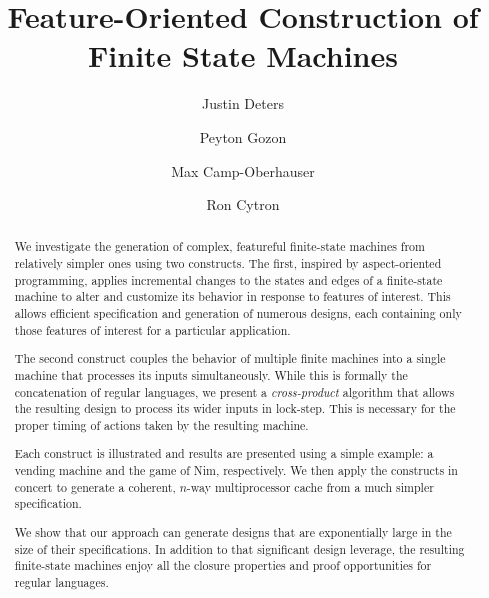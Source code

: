 \documentclass[sigplan,anonymous, review]{acmart}
\begin{document}
\title{Feature-Oriented Construction of Finite State Machines}

\author{Justin Deters}

\author{Peyton Gozon}

\author{Max Camp-Oberhauser}

\author{Ron Cytron}


\renewcommand{\shortauthors}{Deters et al.}

\begin{abstract}
We investigate the generation of complex, featureful finite-state machines from relatively simpler ones using two constructs.  The first, inspired by aspect-oriented programming, applies incremental changes to the states and edges of a finite-state machine to alter and customize its behavior in response to features of interest.   This allows efficient specification and generation of numerous designs, each containing only those features of interest for a particular application.

The second construct couples the behavior of multiple finite machines into a single machine that processes its inputs simultaneously.  While this is formally the concatenation of regular languages, we present a \emph{cross-product} algorithm that allows the resulting design to process its wider inputs in lock-step.  This is necessary for the proper timing of actions taken by the resulting machine. 

Each construct is illustrated and results are presented using a simple example:  a vending machine and the game of Nim, respectively.  We then apply the constructs in concert to generate a coherent, $n$-way multiprocessor cache from a much simpler specification.

We show that our approach can generate designs that are exponentially large in the size of their specifications.  In addition to that significant design leverage, the resulting finite-state machines enjoy all the closure properties and proof opportunities for regular languages.
\end{abstract}
\end{document}
